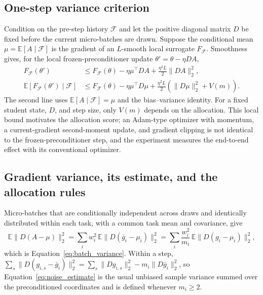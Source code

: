 \subsection{One-step variance criterion}
\label{app:descent}

Condition on the pre-step history $\mathcal F$ and let the positive diagonal
matrix $D$ be fixed before the current micro-batches are drawn. Suppose the
conditional mean $\mu=\mathbb E[A\mid\mathcal F]$ is the gradient of an
$L$-smooth local surrogate $F_{\mathcal F}$. Smoothness gives, for the local
frozen-preconditioner update $\theta'=\theta-\eta DA$,
\begin{equation}
\begin{aligned}
    F_{\mathcal F}(\theta')
    &\leq F_{\mathcal F}(\theta)-\eta\mu^\top DA
       +\frac{\eta^2L}{2}\|DA\|_2^2,\\
    \mathbb E[F_{\mathcal F}(\theta')\mid\mathcal F]
    &\leq F_{\mathcal F}(\theta)-\eta\mu^\top D\mu
       +\frac{\eta^2L}{2}
        \left(\|D\mu\|_2^2+V(m)\right).
\end{aligned}
    \label{eq:one_step_descent}
\end{equation}
The second line uses $\mathbb E[A\mid\mathcal F]=\mu$ and the bias--variance
identity.
For a fixed student state, $D$, and step size, only $V(m)$ depends on the
allocation. This local bound motivates the allocation score; an Adam-type
optimizer with momentum, a current-gradient second-moment update, and gradient
clipping is not identical to the frozen-preconditioner step, and the experiment
measures the end-to-end effect with its conventional optimizer.

\subsection{Gradient variance, its estimate, and the allocation rules}
\label{app:allocation_proofs}

Micro-batches that are conditionally independent across draws and identically
distributed within each task, with a common task mean and covariance, give
\begin{equation}
\mathbb E\|D(A-\mu)\|_2^2
=\sum_iw_i^2\,\mathbb E\|D(\bar g_i-\mu_i)\|_2^2
=\sum_i\frac{w_i^2}{m_i}\,\mathbb E\|D(g_i-\mu_i)\|_2^2,
\end{equation}
which is Equation~\ref{eq:batch_variance}. Within a step,
$\sum_s\|D(g_{i,s}-\bar g_i)\|_2^2=\sum_s\|Dg_{i,s}\|_2^2-m_i\|D\bar g_i\|_2^2$,
so Equation~\ref{eq:noise_estimate} is the usual unbiased sample variance
summed over the preconditioned coordinates and is defined whenever
$m_i\geq2$.

